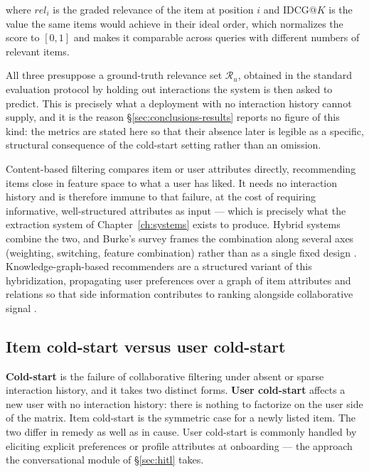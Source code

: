 where $rel_i$ is the graded relevance of the item at position $i$ and $\mathrm{IDCG}@K$ is the value the same items would achieve in their ideal order, which normalizes the score to $[0,1]$ and makes it comparable across queries with different numbers of relevant items.

All three presuppose a ground-truth relevance set $\mathcal{R}_u$, obtained in the standard evaluation protocol by holding out interactions the system is then asked to predict. This is precisely what a deployment with no interaction history cannot supply, and it is the reason \S\ref{sec:conclusions-results} reports no figure of this kind: the metrics are stated here so that their absence later is legible as a specific, structural consequence of the cold-start setting rather than an omission.

Content-based filtering compares item or user attributes directly, recommending items close in feature space to what a user has liked. It needs no interaction history and is therefore immune to that failure, at the cost of requiring informative, well-structured attributes as input — which is precisely what the extraction system of Chapter~\ref{ch:systems} exists to produce. Hybrid systems combine the two, and Burke's survey frames the combination along several axes (weighting, switching, feature combination) rather than as a single fixed design \citep{burke2002hybrid}. Knowledge-graph-based recommenders are a structured variant of this hybridization, propagating user preferences over a graph of item attributes and relations so that side information contributes to ranking alongside collaborative signal \citep{wang2019kgat,guo2022survey}.

\subsection{Item cold-start versus user cold-start}
\label{sec:item-vs-user-coldstart}

\textbf{Cold-start} is the failure of collaborative filtering under absent or sparse interaction history, and it takes two distinct forms. \textbf{User cold-start} affects a new user with no interaction history: there is nothing to factorize on the user side of the matrix. Item cold-start is the symmetric case for a newly listed item. The two differ in remedy as well as in cause. User cold-start is commonly handled by eliciting explicit preferences or profile attributes at onboarding — the approach the conversational module of \S\ref{sec:hitl} takes.

